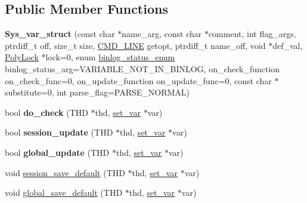 \subsection*{Public Member Functions}
\begin{DoxyCompactItemize}
\item 
\mbox{\label{classSys__var__struct_a5f60e94de429f279f506a63a38940adb}} 
{\bfseries Sys\+\_\+var\+\_\+struct} (const char $\ast$name\+\_\+arg, const char $\ast$comment, int flag\+\_\+args, ptrdiff\+\_\+t off, size\+\_\+t size, \mbox{\hyperlink{structCMD__LINE}{C\+M\+D\+\_\+\+L\+I\+NE}} getopt, ptrdiff\+\_\+t name\+\_\+off, void $\ast$def\+\_\+val, \mbox{\hyperlink{classPolyLock}{Poly\+Lock}} $\ast$lock=0, enum \mbox{\hyperlink{classsys__var_a664520ec82191888717c86085bfa83ce}{binlog\+\_\+status\+\_\+enum}} binlog\+\_\+status\+\_\+arg=V\+A\+R\+I\+A\+B\+L\+E\+\_\+\+N\+O\+T\+\_\+\+I\+N\+\_\+\+B\+I\+N\+L\+OG, on\+\_\+check\+\_\+function on\+\_\+check\+\_\+func=0, on\+\_\+update\+\_\+function on\+\_\+update\+\_\+func=0, const char $\ast$substitute=0, int parse\+\_\+flag=P\+A\+R\+S\+E\+\_\+\+N\+O\+R\+M\+AL)
\item 
\mbox{\label{classSys__var__struct_ada48a626413f54b0cf1a53096dd4229f}} 
bool {\bfseries do\+\_\+check} (T\+HD $\ast$thd, \mbox{\hyperlink{classset__var}{set\+\_\+var}} $\ast$var)
\item 
\mbox{\label{classSys__var__struct_ad922ba43adc8e4a4ee97d202ccaa7596}} 
bool {\bfseries session\+\_\+update} (T\+HD $\ast$thd, \mbox{\hyperlink{classset__var}{set\+\_\+var}} $\ast$var)
\item 
\mbox{\label{classSys__var__struct_a44dd30270dc65e673a4c642de2db2860}} 
bool {\bfseries global\+\_\+update} (T\+HD $\ast$thd, \mbox{\hyperlink{classset__var}{set\+\_\+var}} $\ast$var)
\item 
void \mbox{\hyperlink{classSys__var__struct_a60a7f923174571ad48a593694267b7c7}{session\+\_\+save\+\_\+default}} (T\+HD $\ast$thd, \mbox{\hyperlink{classset__var}{set\+\_\+var}} $\ast$var)
\item 
void \mbox{\hyperlink{classSys__var__struct_a38f274d135a2d5f17fbec6237149a5fe}{global\+\_\+save\+\_\+default}} (T\+HD $\ast$thd, \mbox{\hyperlink{classset__var}{set\+\_\+var}} $\ast$var)
\item 

\end{DoxyCompactItemize}
